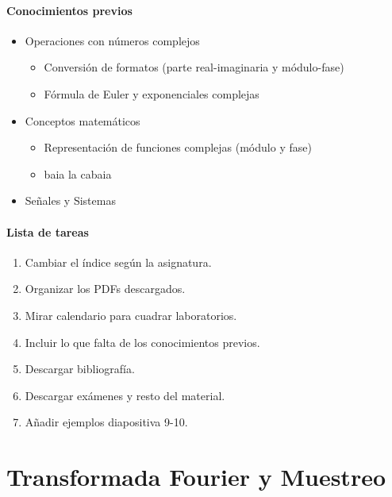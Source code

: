 \documentclass[a4paper]{book}
\begin{document}
\subsubsection{Conocimientos previos} \vspace{\parskip}
\begin{itemize}
	\item Operaciones con números complejos
	      \begin{itemize}
		      \item Conversión de formatos (parte real-imaginaria y módulo-fase)
		      \item Fórmula de Euler y exponenciales complejas
	      \end{itemize}
	\item Conceptos matemáticos
	      \begin{itemize}
		      \item Representación de funciones complejas (módulo y fase)
		      \item baia la cabaia
	      \end{itemize}
	\item Señales y Sistemas
\end{itemize}

\subsubsection{Lista de tareas} \vspace{\parskip}
\begin{enumerate}
	\item Cambiar el índice según la asignatura.
	\item Organizar los PDFs descargados.
	\item Mirar calendario para cuadrar laboratorios.
	\item Incluir lo que falta de los conocimientos previos.
	\item Descargar bibliografía.
	\item Descargar exámenes y resto del material.
	\item Añadir ejemplos diapositiva 9-10.
\end{enumerate}
\newpage

\setlength{\parskip}{0em}
\tableofcontents
\setlength{\parskip}{0.5em}


\chapter*{Transformada Fourier y Muestreo}
\end{document}
